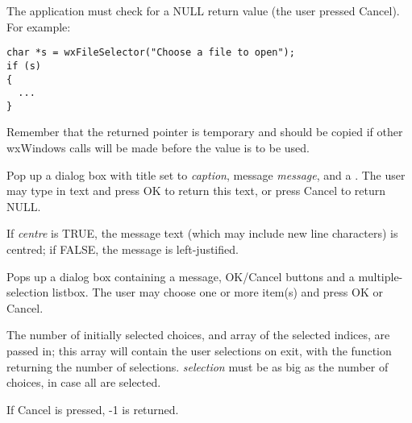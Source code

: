The application must check for a NULL return value (the user pressed
Cancel). For example:

\begin{verbatim}
char *s = wxFileSelector("Choose a file to open");
if (s)
{
  ...
}
\end{verbatim}

Remember that the returned pointer is temporary and should be copied
if other wxWindows calls will be made before the value is to be used.

\label{wxgettextfromuser}


Pop up a dialog box with title set to {\it caption}, message {\it message}, and a
.  The user may type in text and press OK to return this text,
or press Cancel to return NULL.

If {\it centre} is TRUE, the message text (which may include new line characters)
is centred; if FALSE, the message is left-justified.

\label{wxgetmultiplechoice}


Pops up a dialog box containing a message, OK/Cancel buttons and a multiple-selection
listbox. The user may choose one or more item(s) and press OK or Cancel.

The number of initially selected choices, and array of the selected indices,
are passed in; this array will contain the user selections on exit, with
the function returning the number of selections. {\it selection} must be
as big as the number of choices, in case all are selected.

If Cancel is pressed, -1 is returned.

